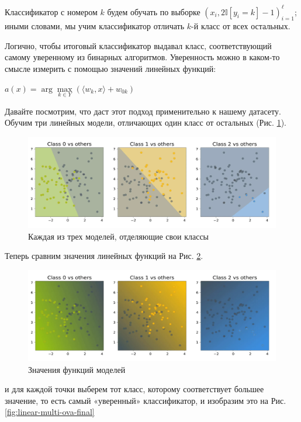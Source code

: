 \begin{itemize}
Классификатор с номером $k$ будем обучать по выборке $(x_i, 2 \mathbb{I}[y_i = k] -1)^\ell_{i=1} $; иными словами, мы учим классификатор отличать $k$-й класс от всех остальных.

Логично, чтобы итоговый классификатор выдавал класс, соответствующий самому уверенному из бинарных алгоритмов. Уверенность можно в каком-то смысле измерить с помощью значений линейных функций:

$ a(x)= \operatorname{arg}\max\limits_{k \in Y} (\langle w_k, x \rangle+w_{0k})$

Давайте посмотрим, что даст этот подход применительно к нашему датасету. Обучим три линейных модели, отличающих один класс от остальных (Рис. \ref{fig:linear-multi-ova-models}).

\begin{figure}[H]
	\centering
	\includegraphics[width=0.8\linewidth]{chapters/linear/pics/multi-ova-models.png}
	\caption{Каждая из трех моделей, отделяющие свои классы}
	\label{fig:linear-multi-ova-models}
\end{figure}

Теперь сравним значения линейных функций на Рис. \ref{fig:linear-multi-ova-values}.

\begin{figure}[H]
	\centering
	\includegraphics[width=0.8\linewidth]{chapters/linear/pics/multi-ova-values.png}
	\caption{Значения функций моделей}
	\label{fig:linear-multi-ova-values}
\end{figure}

и для каждой точки выберем тот класс, которому соответствует большее значение, то есть самый «уверенный» классификатор, и изобразим это на Рис. \ref{fig:linear-multi-ova-final}


\end{itemize}
